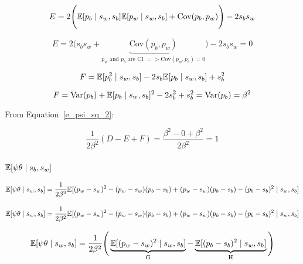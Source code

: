 \documentclass[a4paper,11pt]{article}
\theoremstyle{mytheor}
\newcommand{\E}{\Bbb{E}}
\newcommand{\Var}{\mathrm{Var}}
\newcommand{\Cov}{\mathrm{Cov}}
\begin{document}
\begin{equation}
    \label{e_psi_sq_2_b_2}
    E=2 \Bigg( \E[p_b \mid s_w,s_b]\E[p_w \mid s_w,s_b] + \Cov(p_b,p_w) \Bigg) - 2s_bs_w
\end{equation}

\begin{equation}
    \label{e_psi_sq_2_b_2}
    E=2 \Bigg( s_b s_w +  \underbrace{\Cov(p_b,p_w)}_\text{$p_w$ and $p_b$ are CI $=> \Cov(p_w,p_b)=0$} \Bigg) - 2s_bs_w=0
\end{equation}

\begin{equation}
    \label{e_psi_sq_2_c}
    F=\Bbb{E}[p_b^2\mid s_w,s_b] - 2s_b\Bbb{E}[p_b\mid s_w,s_b] + s_{b}^{2}
\end{equation}

\begin{equation}
    \label{e_psi_sq_2_c_1}
    F=\Var(p_b)+\E[p_b\mid s_w,s_b]^2 - 2s_b^2 + s_{b}^{2} = \Var(p_b) = \beta^2
\end{equation}

From Equation~\ref{e_psi_sq_2}:

\begin{equation}
    \label{e_psi_sq_all_combined}
    \frac{1}{2\beta^2}(D-E+F)=\frac{\beta^2-0+\beta^2}{2\beta^2} = 1
\end{equation}

\subsubsection{$\E[\psi\theta \mid s_b,s_w]$}

\begin{equation}
    \label{e_psi_theta}
    \Bbb{E}[\psi\theta\mid s_w,s_b] = \frac{1}{2\beta^2}\Bbb{E}[(p_w-s_w)^2-(p_w-s_w)(p_b-s_b)+(p_w-s_w)(p_b-s_b)-(p_b-s_b)^2 \mid s_w,s_b]
\end{equation}

\begin{equation}
    \label{e_psi_theta_1}
    \Bbb{E}[\psi\theta\mid s_w,s_b] = \frac{1}{2\beta^2}\Bbb{E}[(p_w-s_w)^2-(p_w-s_w)(p_b-s_b)+(p_w-s_w)(p_b-s_b)-(p_b-s_b)^2 \mid s_w,s_b]
\end{equation}

\begin{equation}
    \label{e_psi_theta_2}
    \Bbb{E}[\psi\theta\mid s_w,s_b] = \frac{1}{2\beta^2} \Bigg( \underbrace{\Bbb{E}[(p_w-s_w)^2 \mid s_w,s_b]}_\text{G} - \underbrace{\E[(p_b-s_b)^2 \mid s_w,s_b]}_\text{H} \Bigg)
\end{equation}
\end{document}
